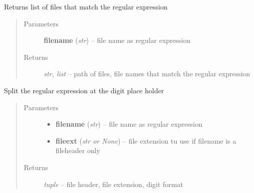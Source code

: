 \documentclass[letterpaper,10pt,english]{sphinxmanual}
\begin{document}
\begin{fulllineitems}
\label{api/ClearMap.IO:ClearMap.IO.FileList.readFileList}
Returns list of files that match the regular expression
\begin{quote}\begin{description}
\item[{Parameters}] \leavevmode
\textbf{filename} (\emph{str}) --
file name as regular expression

\item[{Returns}] \leavevmode
\emph{str, list} --
path of files, file names that match the regular expression

\end{description}\end{quote}

\end{fulllineitems}


\begin{fulllineitems}
\label{api/ClearMap.IO:ClearMap.IO.FileList.splitFileExpression}
Split the regular expression at the digit place holder
\begin{quote}\begin{description}
\item[{Parameters}] \leavevmode\begin{itemize}
\item {} 
\textbf{filename} (\emph{str}) --
file name as regular expression

\item {} 
\textbf{fileext} (\emph{str or None}) --
file extension tu use if filename is a fileheader only

\end{itemize}

\item[{Returns}] \leavevmode
\emph{tuple} --
file header, file extension, digit format

\end{description}\end{quote}

\end{fulllineitems}

\end{document}
